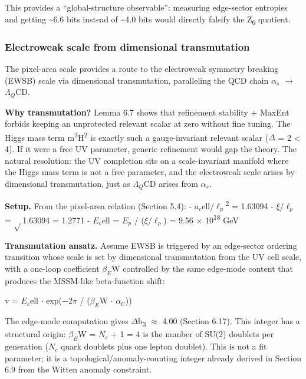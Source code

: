 \documentclass[11pt,a4paper]{article}
\theoremstyle{remark}
\begin{document}
This provides a ``global-structure observable'': measuring edge-sector
entropies and getting \textasciitilde6.6 bits instead of \textasciitilde4.0 bits would
directly falsify the Z\textsubscript{6} quotient.

\subsubsection{Electroweak scale from dimensional transmutation}\label{electroweak-scale-from-dimensional-transmutation}

The pixel-area scale provides a route to the electroweak symmetry breaking
(EWSB) scale via dimensional transmutation, paralleling the QCD chain
\(\ensuremath{\alpha}_s\) \ensuremath{\to} \(\ensuremath{\Lambda}_Q\)CD.

\textbf{Why transmutation?} Lemma 6.7 shows that refinement stability + MaxEnt forbids
keeping an unprotected relevant scalar at zero without fine tuning. The Higgs
mass term m\textsuperscript{2}\textbar H\textbar\textsuperscript{2} is exactly such a gauge-invariant relevant scalar (\ensuremath{\Delta} = 2 \textless{} 4).
If it were a free UV parameter, generic refinement would gap the theory.
The natural resolution: the UV completion sits on a scale-invariant manifold
where the Higgs mass term is not a free parameter, and the electroweak scale
arises by dimensional transmutation, just as \(\ensuremath{\Lambda}_Q\)CD arises from \(\ensuremath{\alpha}_s\).

\textbf{Setup.} From the pixel-area relation (Section 5.4):
- \(a_c\)ell/\(\ensuremath{\ell}_p\)\textsuperscript{2} = 1.63094
- \ensuremath{\xi}/\(\ensuremath{\ell}_p\) = \ensuremath{\sqrt{}}1.63094 = 1.2771
- \(E_c\)ell = \(E_p\) / (\ensuremath{\xi}/\(\ensuremath{\ell}_p\)) = 9.56 \ensuremath{\times} 10\textsuperscript{18} GeV

\textbf{Transmutation ansatz.} Assume EWSB is triggered by an edge-sector ordering transition whose scale is set by dimensional transmutation from the UV cell scale, with a one-loop coefficient \(\ensuremath{\beta}_E\)W controlled by the same edge-mode content that produces the MSSM-like beta-function shift:

v = \(E_c\)ell \ensuremath{\cdot} exp(\ensuremath{-}2\ensuremath{\pi} / (\(\ensuremath{\beta}_E\)W \ensuremath{\cdot} \(\ensuremath{\alpha}_U\)))

The edge-mode computation gives \ensuremath{\Delta}b\textsubscript{3} \ensuremath{\approx} 4.00 (Section 6.17). This integer has a structural origin: \(\ensuremath{\beta}_E\)W = \(N_c\) + 1 = 4 is the number of SU(2) doublets per generation (\(N_c\) quark doublets plus one lepton doublet). This is not a fit parameter; it is a topological/anomaly-counting integer already derived in Section 6.9 from the Witten anomaly constraint.
\end{document}

